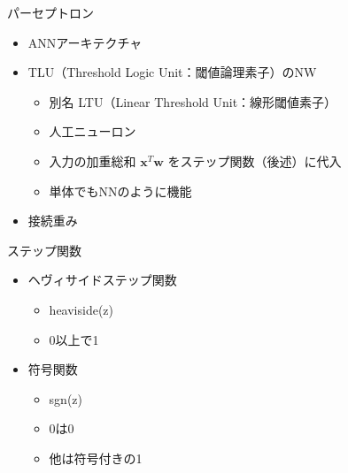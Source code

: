 \documentclass[aspectratio=169, dvipdfmx, 14pt, xcolor={svgnames,dvipsnames}]{beamer}
\def\tightlist{\itemsep1pt\parskip0pt\parsep0pt}
\begin{document}

\begin{frame}{\quad パーセプトロン}
  \begin{itemize}
    \item
          ANNアーキテクチャ
    \item
          TLU（Threshold Logic Unit：閾値論理素子）のNW

          \begin{itemize}
            \tightlist
            \item
                  別名 LTU（Linear Threshold Unit：線形閾値素子）
            \item
                  人工ニューロン
            \item
                  入力の加重総和 $\bm{x}^T \bm{w}$ をステップ関数（後述）に代入
            \item
                  単体でもNNのように機能
          \end{itemize}
    \item
          接続重み
  \end{itemize}
\end{frame}


\begin{frame}{\quad ステップ関数}
  \begin{itemize}
    \item
          ヘヴィサイドステップ関数

          \begin{itemize}
            \tightlist
            \item
                  heaviside(z)
            \item
                  0以上で1
          \end{itemize}
    \item
          符号関数

          \begin{itemize}
            \tightlist
            \item
                  sgn(z)
            \item
                  0は0
            \item
                  他は符号付きの1
          \end{itemize}
  \end{itemize}
\end{frame}
\end{document}
